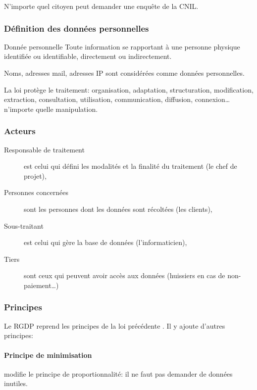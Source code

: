 \documentclass[10pt,a4paper,french]{article}
\begin{document}
N'importe quel citoyen peut demander une enquête de la CNIL.

\subsubsection{Définition des données personnelles}

\begin{cquote}{Donnée personnelle}
Toute information se rapportant à une personne physique identifiée ou identifiable, directement ou indirectement.
\end{cquote}

Noms, adresses mail, adresses IP sont considérées comme données personnelles.

La loi protège le traitement: organisation, adaptation, structuration, modification, extraction, consultation, utilisation, communication, diffusion, connexion\ldots n'importe quelle manipulation.

\subsubsection{Acteurs}

\begin{description}
\item[Responsable de traitement] est celui qui défini les modalités et la finalité du traitement (le chef de projet),
\item[Personnes concernées] sont les personnes dont les données sont récoltées (les clients),
\item[Sous-traitant] est celui qui gère la base de données (l'informaticien),
\item[Tiers] sont ceux qui peuvent avoir accès aux données (huissiers en cas de non-paiement\ldots)
\end{description}

\subsubsection{Principes}

Le RGDP reprend les principes de la loi précédente . Il y ajoute d'autres principes:

\paragraph{Principe de minimisation}
modifie le principe de proportionnalité: il ne faut pas demander de données inutiles.
\end{document}
